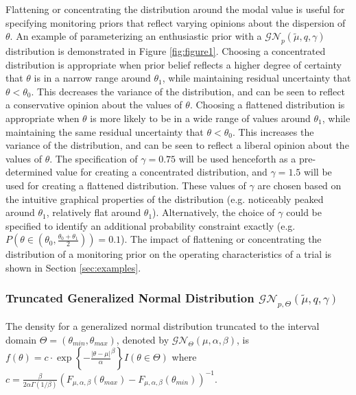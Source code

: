 \documentclass[useAMS,usenatbib,referee]{biom}
\begin{document}
Flattening or concentrating the distribution around the modal value is useful for specifying monitoring priors that reflect varying opinions about the dispersion of $\theta$. An example of parameterizing an enthusiastic prior with a $\mathcal{GN}_p(\tilde{\mu},q,\gamma)$ distribution is demonstrated in Figure \ref{fig:figure1}. Choosing a concentrated distribution is appropriate when prior belief reflects a higher degree of certainty that $\theta$ is in a narrow range around $\theta_1$, while maintaining residual uncertainty that $\theta<\theta_0$. This decreases the variance of the distribution, and can be seen to reflect a conservative opinion about the values of $\theta$. Choosing a flattened distribution is appropriate when $\theta$ is more likely to be in a wide range of values around $\theta_1$, while maintaining the same residual uncertainty that $\theta<\theta_0$. This increases the variance of the distribution, and can be seen to reflect a liberal opinion about the values of $\theta$. The specification of $\gamma=0.75$ will be used henceforth as a pre-determined value for creating a concentrated distribution, and $\gamma=1.5$ will be used for creating a flattened distribution. These values of $\gamma$ are chosen based on the intuitive graphical properties of the distribution (e.g. noticeably peaked around $\theta_1$, relatively flat around $\theta_1$). Alternatively, the choice of $\gamma$ could be specified to identify an additional probability constraint exactly (e.g. $P(\theta\in(\theta_0,\frac{\theta_0+\theta_1}{2}))=0.1$). The impact of flattening or concentrating the distribution of a monitoring prior on the operating characteristics of a trial is shown in Section \ref{sec:examples}.

\subsubsection{Truncated Generalized Normal Distribution $\mathcal{GN}_{p,\Theta}(\tilde{\mu},q,\gamma)$}
The density for a generalized normal distribution truncated to the interval domain $\Theta=(\theta_{min},\theta_{max})$, denoted by $\mathcal{GN}_\Theta(\mu,\alpha,\beta)$, is $f(\theta)=c\cdot\exp\left\{-\frac{|\theta-\mu|}{\alpha}^{\beta}\right\}{I(\theta\in \Theta)}$ where $c=\frac{\beta}{2\alpha \Gamma(1/\beta)}({F_{\mu,\alpha,\beta}(\theta_{max})-F_{\mu,\alpha,\beta}(\theta_{min})})^{-1}$. 
\end{document}
